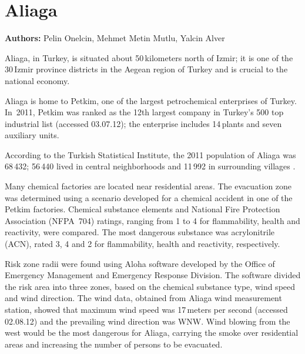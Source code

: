 \chapter{Aliaga}
\label{ch:aliaga}
\hfill \textbf{Authors:} Pelin Onelcin, Mehmet Metin Mutlu, Yalcin Alver


Aliaga, in Turkey, is situated about 50\,kilometers north of Izmir; it is one of the 30\,Izmir province districts in the Aegean region of Turkey and is crucial to the national economy. 
 
Aliaga is home to Petkim, one of the largest petrochemical enterprises of Turkey.
In~2011, Petkim was ranked as the 12th largest company in Turkey's 500 top industrial list \citep[][]{ICI_Webpage_2012}(accessed 03.07.12); the enterprise includes 14\,plants and seven auxiliary units. 

According to the Turkish Statistical Institute, the 2011 population of Aliaga was 68\,432; 56\,440 lived in central neighborhoods and 11\,992 in surrounding villages \citep[][]{TSI_Webpage_2011}.

Many chemical factories are located near residential areas. The evacuation zone was determined using a scenario developed for a chemical accident in one of the Petkim factories. Chemical substance elements and  National Fire Protection Association (NFPA~704) ratings, ranging from 1 to 4 for flammability, health and reactivity, were compared. The most dangerous substance was acrylonitrile (ACN), rated 3, 4 and 2 for flammability, health and reactivity, respectively.

Risk zone radii were found using Aloha software developed by the Office of Emergency Management and Emergency Response Division. The software divided the risk area into three zones, based on the chemical substance type, wind speed and wind direction. The wind data, obtained from Aliaga wind measurement station, showed that maximum wind speed was 17\,meters per second \citep[][]{Wolfram_Webpage_2012}(accessed 02.08.12) and the prevailing wind direction was WNW. Wind blowing from the west would be the most dangerous for Aliaga, carrying the smoke over residential areas and increasing the number of persons to be evacuated.

